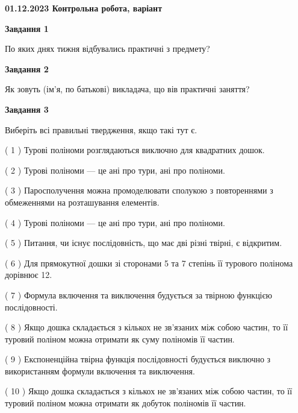 \documentclass[12pt, ukrainian]{article}
\begin{document}
\begin {large}

\textbf{01.12.2023 Контрольна робота, варіант  }\par


{
{\begin {center}\textbf{Завдання 1}\end {center}}\par
По яких днях тижня відбувались практичні з предмету?\par
{\begin {center}\textbf{Завдання 2}\end {center}}\par
Як зовуть (ім'я, по батькові) викладача, що вів практичні заняття?\par
{\begin {center}\textbf{Завдання 3}\end {center}}\par
Виберіть всі правильні твердження, якщо такі тут є.\par
\vspace{2mm}
( 1 ) Турові поліноми розглядаються виключно для квадратних дошок.%

( 2 ) Турові поліноми --- це ані про тури, ані про поліноми.%

( 3 ) Паросполучення можна промоделювати сполукою з повтореннями з обмеженнями на розташування елементів.%

( 4 ) Турові поліноми --- це ані про тури, ані про поліноми.%

( 5 ) Питання, чи існує послідовність, що має дві різні твірні, є відкритим.%

( 6 ) Для прямокутної дошки зі сторонами 5 та 7 степінь її турового полінома дорівнює 12.%

( 7 ) Формула включення та виключення будується за твірною функцією послідовності.%

( 8 ) Якщо дошка складається з кількох не зв’язаних між собою частин, то її туровий поліном можна отримати як суму поліномів її частин.%

( 9 ) Експоненційна твірна функція послідовності будується виключно з використанням формули включення та виключення.%

( 10 ) Якщо дошка складається з кількох не зв’язаних між собою частин, то її туровий поліном можна отримати як добуток поліномів її частин.%
}
\end {large}

\vspace{4mm}
\newpage
\end{document}
